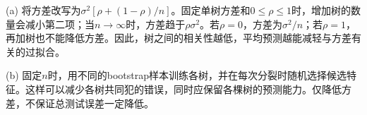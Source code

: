 (a) 将方差改写为\(\sigma^2[\rho+(1-\rho)/n]\)。固定单树方差和\(0\le\rho\le1\)时，增加树的数量会减小第二项；当\(n\to\infty\)时，方差趋于\(\rho\sigma^2\)。若\(\rho=0\)，方差为\(\sigma^2/n\)；若\(\rho=1\)，再加树也不能降低方差。因此，树之间的相关性越低，平均预测越能减轻与方差有关的过拟合。


(b) 固定\(n\)时，用不同的bootstrap样本训练各树，并在每次分裂时随机选择候选特征。这样可以减少各树共同犯的错误，同时应保留各棵树的预测能力。仅降低方差，不保证总测试误差一定降低。
